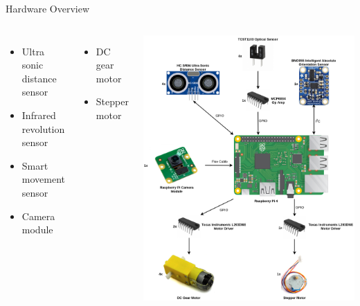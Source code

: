 \documentclass{beamer}
\begin{document}
\begin{frame}{Hardware Overview}
\begin{columns}
\begin{itemize}
\item Ultra sonic distance sensor
\item Infrared revolution sensor
\item Smart movement sensor
\item Camera module
\end{itemize}
\vspace{5mm}
\begin{itemize}
\item<2-> DC gear motor
\item<2-> Stepper motor
\end{itemize}
 
\includegraphics[scale=0.19]{sources/hardware_setup.png}
\end{columns}
\end{frame}
\end{document}
